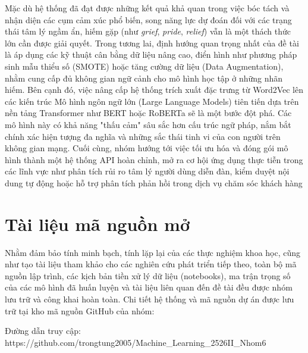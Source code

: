 Mặc dù hệ thống đã đạt được những kết quả khả quan trong việc bóc tách và nhận diện các cụm cảm xúc phổ biến, song năng lực dự đoán đối với các trạng thái tâm lý ngầm ẩn, hiếm gặp (như \textit{grief}, \textit{pride}, \textit{relief}) vẫn là một thách thức lớn cần được giải quyết. Trong tương lai, định hướng quan trọng nhất của đề tài là áp dụng các kỹ thuật cân bằng dữ liệu nâng cao, điển hình như phương pháp sinh mẫu thiểu số (SMOTE) hoặc tăng cường dữ liệu (Data Augmentation), nhằm cung cấp đủ không gian ngữ cảnh cho mô hình học tập ở những nhãn hiếm. Bên cạnh đó, việc nâng cấp hệ thống trích xuất đặc trưng từ Word2Vec lên các kiến trúc Mô hình ngôn ngữ lớn (Large Language Models) tiên tiến dựa trên nền tảng Transformer như BERT hoặc RoBERTa sẽ là một bước đột phá. Các mô hình này có khả năng "thấu cảm" sâu sắc hơn cấu trúc ngữ pháp, nắm bắt chính xác hiện tượng đa nghĩa và những sắc thái tinh vi của con người trên không gian mạng. Cuối cùng, nhóm hướng tới việc tối ưu hóa và đóng gói mô hình thành một hệ thống API hoàn chỉnh, mở ra cơ hội ứng dụng thực tiễn trong các lĩnh vực như phân tích rủi ro tâm lý người dùng diễn đàn, kiểm duyệt nội dung tự động hoặc hỗ trợ phân tích phản hồi trong dịch vụ chăm sóc khách hàng

\section{Tài liệu mã nguồn mở}

Nhằm đảm bảo tính minh bạch, tính lặp lại của các thực nghiệm khoa học, cũng như tạo tài liệu tham khảo cho các nghiên cứu phát triển tiếp theo, toàn bộ mã nguồn lập trình, các kịch bản tiền xử lý dữ liệu (notebooks), ma trận trọng số của các mô hình đã huấn luyện và tài liệu liên quan đến đề tài đều được nhóm lưu trữ và công khai hoàn toàn.
Chi tiết hệ thống và mã nguồn dự án được lưu trữ tại kho mã nguồn GitHub của nhóm:

Đường dẫn truy cập: https://github.com/trongtung2005/Machine\_Learning\_2526II\_Nhom6